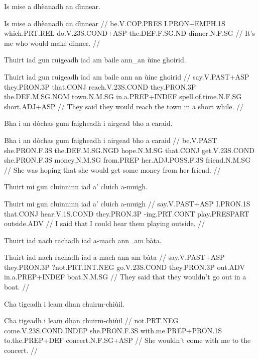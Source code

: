 \documentclass[a4paper,10pt]{article}
\begin{document}
\ex
\begingl
\glpre Is mise a dhèanadh an dìnnear. 

\vspace{4mm}
\gla Is mise a dhèanadh an dìnnear  //
\glb be.V.COP.PRES I.PRON+EMPH.1S which.PRT.REL do.V.23S.COND+ASP the.DEF.F.SG.ND dinner.N.F.SG  //
\glft It's me who would make dinner. //
\endgl
\xe

\ex
\begingl
\glpre Thuirt iad gun ruigeadh iad am baile ann\_an ùine ghoirid. 

\vspace{4mm}
\gla Thuirt iad gun ruigeadh iad am baile {ann an} ùine ghoirid  //
\glb say.V.PAST+ASP they.PRON.3P that.CONJ reach.V.23S.COND they.PRON.3P the.DEF.M.SG.NOM town.N.M.SG in.a.PREP+INDEF spell.of.time.N.F.SG short.ADJ+ASP  //
\glft They said they would reach the town in a short while. //
\endgl
\xe

\ex
\begingl
\glpre Bha i an dòchas gum faigheadh i airgead bho a caraid. 

\vspace{4mm}
\gla Bha i an dòchas gum faigheadh i airgead bho a caraid  //
\glb be.V.PAST she.PRON.F.3S the.DEF.M.SG.NGD hope.N.M.SG that.CONJ get.V.23S.COND she.PRON.F.3S money.N.M.SG from.PREP her.ADJ.POSS.F.3S friend.N.M.SG  //
\glft She was hoping that she would get some money from her friend. //
\endgl
\xe

\ex
\begingl
\glpre Thuirt mi gun cluinninn iad a' cluich a-muigh. 

\vspace{4mm}
\gla Thuirt mi gun cluinninn iad a' cluich a-muigh  //
\glb say.V.PAST+ASP I.PRON.1S that.CONJ hear.V.1S.COND they.PRON.3P -ing.PRT.CONT play.PRESPART outside.ADV  //
\glft I said that I could hear them playing outside. //
\endgl
\xe

\ex
\begingl
\glpre Thuirt iad nach rachadh iad a-mach ann\_am bàta. 

\vspace{4mm}
\gla Thuirt iad nach rachadh iad a-mach {ann am} bàta  //
\glb say.V.PAST+ASP they.PRON.3P ?not.PRT.INT.NEG go.V.23S.COND they.PRON.3P out.ADV in.a.PREP+INDEF boat.N.M.SG  //
\glft They said that they wouldn't go out in a boat. //
\endgl
\xe

\ex
\begingl
\glpre Cha tigeadh i leam dhan chuirm-chiùil. 

\vspace{4mm}
\gla Cha tigeadh i leam dhan chuirm-chiùil  //
\glb not.PRT.NEG come.V.23S.COND.INDEP she.PRON.F.3S with.me.PREP+PRON.1S to.the.PREP+DEF concert.N.F.SG+ASP  //
\glft She wouldn't come with me to the concert. //
\endgl
\xe
\end{document}
